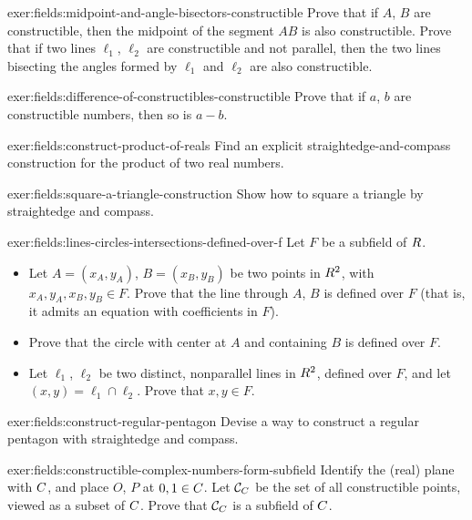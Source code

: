\begin{exer}{}{exer:fields:midpoint-and-angle-bisectors-constructible}
  Prove that if $A$, $B$ are constructible, then the midpoint of the
  segment $AB$ is also constructible. Prove that if two lines
  $\ell_1$, $\ell_2$ are constructible and not parallel, then the two
  lines bisecting the angles formed by $\ell_1$ and $\ell_2$ are also
  constructible.
\end{exer}
\begin{exer}{}{exer:fields:difference-of-constructibles-constructible}
  Prove that if $a$, $b$ are constructible numbers, then so is
  $a - b$.
\end{exer}
\begin{exer}{}{exer:fields:construct-product-of-reals}
  Find an explicit straightedge-and-compass construction for the
  product of two real numbers.
\end{exer}
\begin{exer}{}{exer:fields:square-a-triangle-construction}
  Show how to square a triangle by straightedge and compass.
\end{exer}
\begin{exer}{}{exer:fields:lines-circles-intersections-defined-over-f}
  Let $F$ be a subfield of $R$.
  \begin{itemize}
  \item Let $A = (x_A, y_A)$, $B = (x_B, y_B)$ be two points in
    $R^2$, with $x_A, y_A, x_B, y_B \in F$. Prove that the line
    through $A$, $B$ is defined over $F$ (that is, it admits an
    equation with coefficients in $F$).
  \item Prove that the circle with center at $A$ and containing $B$ is
    defined over $F$.
  \item Let $\ell_1$, $\ell_2$ be two distinct, nonparallel lines in
    $R^2$, defined over $F$, and let $(x, y) = \ell_1 \cap
    \ell_2$. Prove that $x, y \in F$.
  \end{itemize}
\end{exer}
\begin{exer}{}{exer:fields:construct-regular-pentagon}
  Devise a way to construct a regular pentagon with straightedge and
  compass.
\end{exer}
\begin{exer}{}{exer:fields:constructible-complex-numbers-form-subfield}
  Identify the (real) plane with $C$, and place $O$, $P$ at
  $0, 1 \in C$. Let $\mathcal{C}_{C}$ be the set of all
  constructible points, viewed as a subset of $C$. Prove that
  $\mathcal{C}_{C}$ is a subfield of $C$.
\end{exer}

